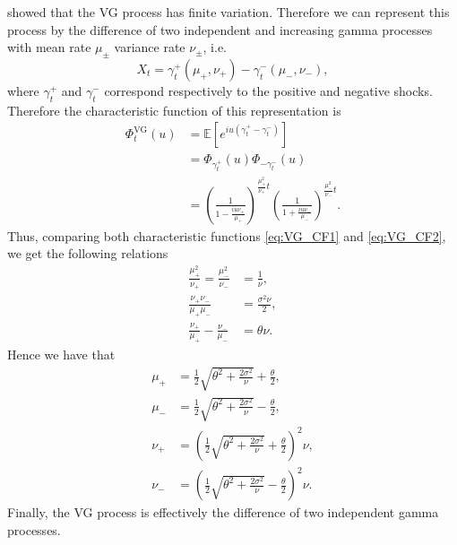 \citeauthor{MCC98} \citeyearpar{MCC98} showed that the VG process has finite variation. Therefore we can represent this process by the difference of two independent and increasing gamma processes with mean rate $\mu_\pm$ variance rate $\nu_\pm$, i.e.
$$X_t = \gamma_t^+(\mu_+,\nu_+)-\gamma_t^-(\mu_-,\nu_-),$$
where $\gamma^+_t$ and $\gamma^-_t$ correspond respectively to the positive and negative shocks. Therefore the characteristic function of this representation is
\begin{align}\label{eq:VG_CF2}
\Phi_t^{\text{VG}}(u)&=\mathbb{E}\left[e^{iu(\gamma_t^+-\gamma_t^-)}\right]\nonumber\\
&=\Phi_{\gamma_t^+}(u)\Phi_{-\gamma_t^-}(u)\nonumber\\
&=\left(\frac{1}{1-\frac{iu\nu_+}{\mu_+}}\right)^{\frac{\mu_+^2}{\nu
_+}t}\left(\frac{1}{1+\frac{iu\nu_-}{\mu_-}}\right)^{\frac{\mu_-^2}{\nu_-}t}.
\end{align}
Thus, comparing both characteristic functions \eqref{eq:VG_CF1} and \eqref{eq:VG_CF2}, we get the following relations
\begin{align*}
\frac{\mu_+^2}{\nu_+}=\frac{\mu_-^2}{\nu_-}&=\frac{1}{\nu},\\
\frac{\nu_+\nu_-}{\mu_+\mu_-}&=\frac{\sigma^2\nu}{2},\\
\frac{\nu_+}{\mu_+}-\frac{\nu_-}{\mu_-}&=\theta\nu.
\end{align*}
Hence we have that
\begin{align*}
\mu_+&= \frac{1}{2}\sqrt{\theta^2+\frac{2\sigma^2}{\nu}}+\frac{\theta}{2}, \\
\mu_-&= \frac{1}{2}\sqrt{\theta^2+\frac{2\sigma^2}{\nu}}-\frac{\theta}{2},\\
\nu_+&= \left(\frac{1}{2}\sqrt{\theta^2+\frac{2\sigma^2}{\nu}}+\frac{\theta}{2}\right)^2\nu,\\
\nu_-&= \left(\frac{1}{2}\sqrt{\theta^2+\frac{2\sigma^2}{\nu}}-\frac{\theta}{2}\right)^2\nu.
\end{align*}
Finally, the VG process is effectively the difference of two independent gamma processes.
